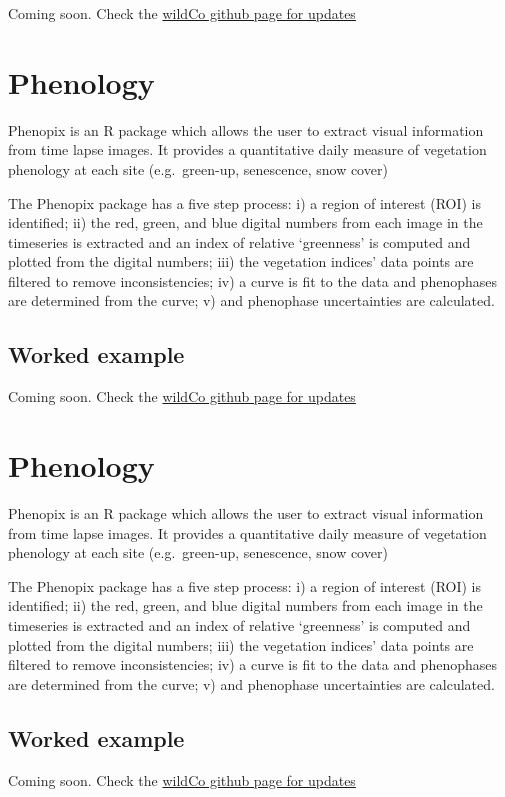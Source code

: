 \documentclass[]{book}
\begin{document}
Coming soon. Check the \href{https://github.com/WildCoLab}{wildCo github
page for updates}

\chapter{Phenology}\label{phenology-2}

Phenopix is an R package which allows the user to extract visual
information from time lapse images. It provides a quantitative daily
measure of vegetation phenology at each site (e.g.~green-up, senescence,
snow cover)

The Phenopix package has a five step process: i) a region of interest
(ROI) is identified; ii) the red, green, and blue digital numbers from
each image in the timeseries is extracted and an index of relative
`greenness' is computed and plotted from the digital numbers; iii) the
vegetation indices' data points are filtered to remove inconsistencies;
iv) a curve is fit to the data and phenophases are determined from the
curve; v) and phenophase uncertainties are calculated.

\section{Worked example}\label{worked-example-2}

Coming soon. Check the \href{https://github.com/WildCoLab}{wildCo github
page for updates}

\chapter{Phenology}\label{phenology-3}

Phenopix is an R package which allows the user to extract visual
information from time lapse images. It provides a quantitative daily
measure of vegetation phenology at each site (e.g.~green-up, senescence,
snow cover)

The Phenopix package has a five step process: i) a region of interest
(ROI) is identified; ii) the red, green, and blue digital numbers from
each image in the timeseries is extracted and an index of relative
`greenness' is computed and plotted from the digital numbers; iii) the
vegetation indices' data points are filtered to remove inconsistencies;
iv) a curve is fit to the data and phenophases are determined from the
curve; v) and phenophase uncertainties are calculated.

\section{Worked example}\label{worked-example-3}

Coming soon. Check the \href{https://github.com/WildCoLab}{wildCo github
page for updates}


\end{document}
